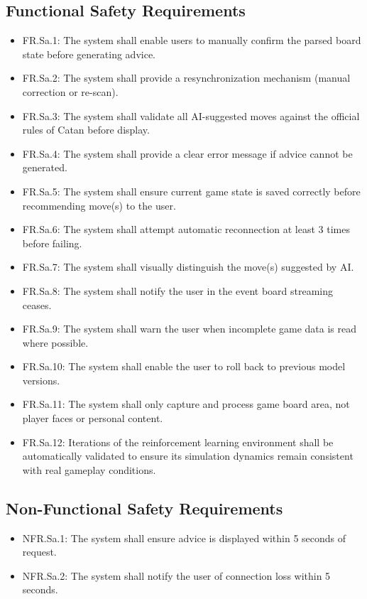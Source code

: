 \documentclass{article}
\begin{document}
\subsection{Functional Safety Requirements}
\begin{itemize}
    \item FR.Sa.1: The system shall enable users to manually confirm the parsed board state before generating advice.
    \item FR.Sa.2: The system shall provide a resynchronization mechanism (manual correction or re-scan).
    \item FR.Sa.3: The system shall validate all AI-suggested moves against the official rules of Catan before display.
    \item FR.Sa.4: The system shall provide a clear error message if advice cannot be generated.
    \item FR.Sa.5: The system shall ensure current game state is saved correctly before recommending move(s) to the user.
    \item FR.Sa.6: The system shall attempt automatic reconnection at least 3 times before failing.
    \item FR.Sa.7: The system shall visually distinguish the move(s) suggested by AI.
    \item FR.Sa.8: The system shall notify the user in the event board streaming ceases.
    \item FR.Sa.9: The system shall warn the user when incomplete game data is read where possible.
    \item FR.Sa.10: The system shall enable the user to roll back to previous model versions.
    \item FR.Sa.11: The system shall only capture and process game board area, not player faces or personal content.
    \item FR.Sa.12: Iterations of the reinforcement learning environment shall be automatically validated to ensure its simulation dynamics remain consistent with real gameplay conditions. \newline
\end{itemize}

\subsection{Non-Functional Safety Requirements}
\begin{itemize}
    \item NFR.Sa.1: The system shall ensure advice is displayed within 5 seconds of request.
    \item NFR.Sa.2: The system shall notify the user of connection loss within 5 seconds.
\end{itemize}
\end{document}
